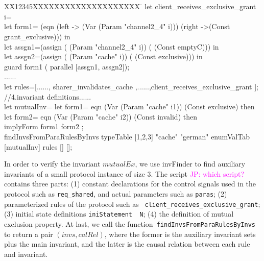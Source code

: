 \documentclass{llncs}
\newlength{\fminilength}
\newenvironment{fmini}[1][\linewidth]
  {\setlength{\fminilength}{#1\fboxsep-2\fboxrule}%
   \vspace{2ex}\noindent\begin{lrbox}{\fminibox}\begin{minipage}{\fminilength}%
   \mbox{ }\hfill\vspace{-2.5ex}}%
  {\end{minipage}\end{lrbox}\vspace{1ex}\hspace{0ex}%
   \framebox{\usebox{\fminibox}}}
\newenvironment{specification}
{\noindent\scriptsize \tt\begin{fmini}\begin{tabbing}X\=X12345\=XXXX\=XXXX\=XXXX\=XXXX\=XXXX
\=\+\kill} {\end{tabbing}\normalfont\end{fmini}}
\newcommand\JP[1]{\textcolor{magenta}{JP: #1}}
\begin{document}
\begin{specification}
let client\_receives\_exclusive\_grant i=\\
    let form1= (eqn (left -> (Var (Param "channel2\_4" i)))  (right ->(Const grant\_exclusive))) in\\
    let assgn1=(assign  (  (Param "channel2\_4" i)) ( (Const emptyC))) in\\
    let assgn2=(assign  (  (Param "cache" i)) ( (Const exclusive))) in\\
    guard form1 ( parallel [assgn1, assgn2]);\\
......\\
let rules=[......,  sharer\_invalidates\_cache ,......,client\_receives\_exclusive\_grant  ];\\
//4.invariant definitions......\\
let mutualInv=
   let form1= eqn  (Var (Param "cache" i1)) (Const exclusive) then\\
  let form2= eqn  (Var (Param "cache" i2)) (Const invalid) then\\
  implyForm form1 form2 ;\\

  findInvsFromParaRulesByInvs  typeTable [1,2,3] "cache" "german" enumValTab [mutualInv] rules  [] [];
 \end{specification}


In order to verify the invariant $mutualEx$,  we use
{\sf invFinder} to find auxiliary invariants of a small
protocol instance of size $3$. The script \JP{which script?} contains three parts:
(1) constant declarations for the control signals used in the
protocol such as {\tt req\_shared}, and actual parameters such as
{\tt paras}; (2) parameterized rules of the protocol such as {\tt
client\_receives\_exclusive\_grant}; (3) initial state definitions
{\tt  iniStatement ~N}; (4) the definition of mutual exclusion
property. At last, we call the function{\tt
findInvsFromParaRulesByInvs} to return a pair $(invs,calRel)$, where
the former is the auxiliary invariant sets plus the main invariant,
and the latter is the causal relation between each rule and
invariant.
\end{document}
